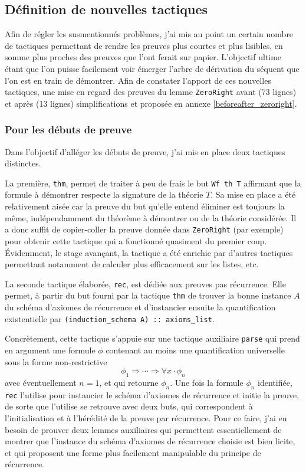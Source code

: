 \documentclass[a4paper]{article}
\theoremstyle{remark}
\theoremstyle{remark}
\theoremstyle{remark}
\theoremstyle{definition}
\theoremstyle{definition}
\theoremstyle{definition}
\begin{document}
\subsection{Définition de nouvelles tactiques}

Afin de régler les susmentionnés problèmes, j'ai mis au point un certain nombre de tactiques permettant de rendre les preuves plus courtes et plus lisibles, en somme plus proches des preuves que l'ont ferait sur papier. L'objectif ultime étant que l'on puisse facilement voir émerger l'arbre de dérivation du séquent que l'on est en train de démontrer. Afin de constater l'apport de ces nouvelles tactiques, une mise en regard des preuves du lemme \verb+ZeroRight+ avant (73 lignes) et après (13 lignes) simplifications et proposée en annexe \ref{beforeafter_zeroright}.

\subsubsection{Pour les débuts de preuve}

Dans l'objectif d'alléger les débuts de preuve, j'ai mis en place deux tactiques distinctes.
\smallskip

La première, \verb+thm+, permet de traiter à peu de frais le but \verb+Wf th T+ affirmant que la formule à démontrer respecte la signature de la théorie $T$. Sa mise en place a été relativement aisée car la preuve du but qu'elle entend éliminer est toujours la même, indépendamment du théorème à démontrer ou de la théorie considérée. Il a donc suffit de copier-coller la preuve donnée dans \verb+ZeroRight+ (par exemple) pour obtenir cette tactique qui a fonctionné quasiment du premier coup. \'Evidemment, le stage avançant, la tactique a été enrichie par d'autres tactiques permettant notamment de calculer plus efficacement sur les listes, etc.
\smallskip

La seconde tactique élaborée, \verb+rec+, est dédiée aux preuves pas récurrence. Elle permet, à partir du but fourni par la tactique \verb+thm+ de trouver la bonne instance $A$ du schéma d'axiomes de récurrence et d'instancier ensuite la quantification existentielle par \verb$(induction_schema A) :: axioms_list$.

Concrètement, cette tactique s'appuie sur une tactique auxiliaire \verb+parse+ qui prend en argument une formule $\phi$ contenant au moins une quantification universelle sous la forme non-restrictive \[ \phi_1 \Rightarrow \cdots \Rightarrow \forall x \cdot \phi_n \] avec éventuellement $n = 1$, et qui retourne $\phi_n$. Une fois la formule $\phi_n$ identifiée, \verb+rec+ l'utilise pour instancier le schéma d'axiomes de récurrence et initie la preuve, de sorte que l'utilise se retrouve avec deux buts, qui correspondent à l'initialisation et à l'hérédité de la preuve par récurrence. Pour ce faire, j'ai eu besoin de prouver deux lemmes auxiliaires qui permettent essentiellement de montrer que l'instance du schéma d'axiomes de récurrence choisie est bien licite, et qui proposent une forme plus facilement manipulable du principe de récurrence.
\end{document}
